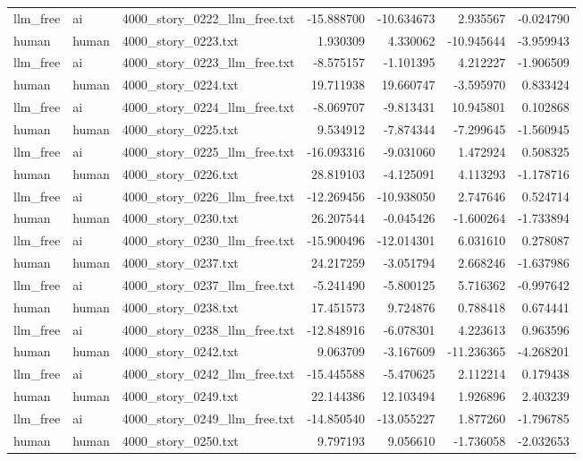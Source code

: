 \begin{longtable}{lllrrrr}
llm\_free & ai & 4000\_story\_0222\_llm\_free.txt & -15.888700 & -10.634673 & 2.935567 & -0.024790 \\
human & human & 4000\_story\_0223.txt & 1.930309 & 4.330062 & -10.945644 & -3.959943 \\
llm\_free & ai & 4000\_story\_0223\_llm\_free.txt & -8.575157 & -1.101395 & 4.212227 & -1.906509 \\
human & human & 4000\_story\_0224.txt & 19.711938 & 19.660747 & -3.595970 & 0.833424 \\
llm\_free & ai & 4000\_story\_0224\_llm\_free.txt & -8.069707 & -9.813431 & 10.945801 & 0.102868 \\
human & human & 4000\_story\_0225.txt & 9.534912 & -7.874344 & -7.299645 & -1.560945 \\
llm\_free & ai & 4000\_story\_0225\_llm\_free.txt & -16.093316 & -9.031060 & 1.472924 & 0.508325 \\
human & human & 4000\_story\_0226.txt & 28.819103 & -4.125091 & 4.113293 & -1.178716 \\
llm\_free & ai & 4000\_story\_0226\_llm\_free.txt & -12.269456 & -10.938050 & 2.747646 & 0.524714 \\
human & human & 4000\_story\_0230.txt & 26.207544 & -0.045426 & -1.600264 & -1.733894 \\
llm\_free & ai & 4000\_story\_0230\_llm\_free.txt & -15.900496 & -12.014301 & 6.031610 & 0.278087 \\
human & human & 4000\_story\_0237.txt & 24.217259 & -3.051794 & 2.668246 & -1.637986 \\
llm\_free & ai & 4000\_story\_0237\_llm\_free.txt & -5.241490 & -5.800125 & 5.716362 & -0.997642 \\
human & human & 4000\_story\_0238.txt & 17.451573 & 9.724876 & 0.788418 & 0.674441 \\
llm\_free & ai & 4000\_story\_0238\_llm\_free.txt & -12.848916 & -6.078301 & 4.223613 & 0.963596 \\
human & human & 4000\_story\_0242.txt & 9.063709 & -3.167609 & -11.236365 & -4.268201 \\
llm\_free & ai & 4000\_story\_0242\_llm\_free.txt & -15.445588 & -5.470625 & 2.112214 & 0.179438 \\
human & human & 4000\_story\_0249.txt & 22.144386 & 12.103494 & 1.926896 & 2.403239 \\
llm\_free & ai & 4000\_story\_0249\_llm\_free.txt & -14.850540 & -13.055227 & 1.877260 & -1.796785 \\
human & human & 4000\_story\_0250.txt & 9.797193 & 9.056610 & -1.736058 & -2.032653 \\

\end{longtable}
